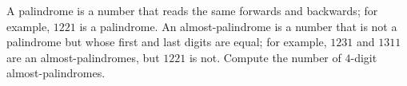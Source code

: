 A palindrome is a number that reads the same forwards and backwards; for example, $1221$ is a palindrome. An almost-palindrome is a number that is not a palindrome but whose first and last digits are equal; for example, $1231$ and $1311$ are an almost-palindromes, but $1221$ is not. Compute the number of $4$-digit almost-palindromes.
